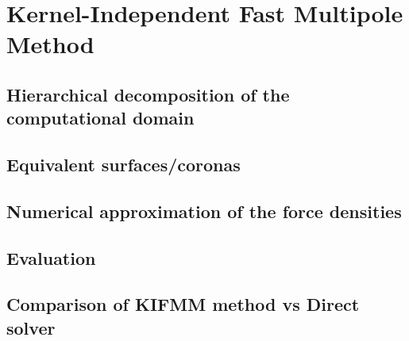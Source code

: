 \section{Kernel-Independent Fast Multipole Method}

\subsection{Hierarchical decomposition of the computational domain}
\subsection{Equivalent surfaces/coronas}
\subsection{Numerical approximation of the force densities}
\subsection{Evaluation}
\subsection{Comparison of KIFMM method vs Direct solver}
